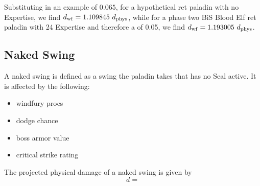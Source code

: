 \documentclass[letterpaper,11pt]{article}
\begin{document}
	Substituting in an example \pdodge of $0.065$, for a hypothetical ret paladin with no Expertise, we find $d_\mathrm{wf} = 1.109845~d_{\mathrm{phys}} $, while for a phase two BiS Blood Elf ret paladin with 24 Expertise and therefore a \pdodge of 0.05, we find $d_\mathrm{wf} = 1.193005~d_{\mathrm{phys}} $.
			

	
%	
%	
%	
%

	
	\subsection{Naked Swing}
	A naked swing is defined as a swing the paladin takes that has no Seal active.
	It is affected by the following:
	\begin{itemize}
		\item windfury procs
		\item dodge chance
		\item boss armor value
		\item critical strike rating
	\end{itemize}
	The projected physical damage of a naked swing is given by
	\begin{equation}
		d = 
	\end{equation}
	




	\appendix
	
\end{document}

